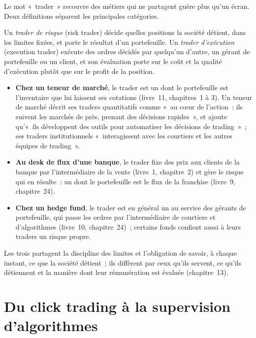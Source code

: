 Le mot «~trader~» recouvre des métiers qui ne partagent guère plus qu'un écran. Deux définitions séparent les principales catégories.

\begin{definition}\label{def:in:trader:kinds}
Un \emph{trader de risque} (risk trader) décide quelles positions la société détient, dans les limites fixées, et porte le
résultat d'un portefeuille. Un \emph{trader d'exécution} (execution trader) exécute des ordres décidés par quelqu'un d'autre, un gérant
de portefeuille ou un client, et son évaluation porte sur le coût et la qualité d'exécution plutôt que sur le profit de la position.
\end{definition}

\begin{itemize}
\item \textbf{Chez un teneur de marché}, le trader est un  dont le portefeuille est l'inventaire que lui laissent
ses cotations (livre~11, chapitres~1 à 3). Un teneur de marché décrit ses traders quantitatifs comme «~au cœur de l'action~: ils suivent
les marchés de près, prenant des décisions rapides~», et ajoute qu'«~ils développent des outils pour automatiser les décisions de trading~»~; ses
traders institutionnels «~interagissent avec les courtiers et les autres équipes de trading~».
\item \textbf{Au desk de flux d'une banque}, le trader fixe des prix aux clients de la banque par l'intermédiaire de la vente (livre~1, chapitre~2) et
gère le risque qui en résulte~: un  dont le portefeuille est le flux de la franchise (livre~9, chapitre~24).
\item \textbf{Chez un hedge fund}, le trader est en général un  au service des gérants de portefeuille, qui
passe les ordres par l'intermédiaire de courtiers et d'algorithmes (livre~10, chapitre~24)~; certains fonds confient aussi à leurs traders un risque propre.
\end{itemize}
Les trois partagent la discipline des limites et l'obligation de savoir, à chaque instant, ce que la société détient~; ils diffèrent
par ceux qu'ils servent, ce qu'ils détiennent et la manière dont leur rémunération est évaluée (chapitre~13).

\section{Du click trading à la supervision d'algorithmes}

